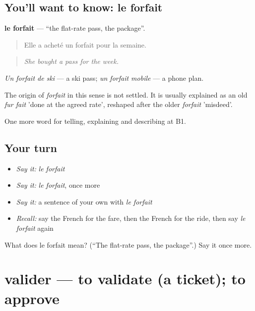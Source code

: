 \subsection*{You'll want to know: le forfait}
\textbf{le forfait} — \textquotedblleft{}the flat-rate pass, the package\textquotedblright{}.

\begin{quote}
Elle a acheté un forfait pour la semaine.
\end{quote}

\begin{quote}
\emph{She bought a pass for the week.}
\end{quote}

\emph{Un forfait de ski} — a ski pass; \emph{un forfait mobile} — a phone plan.

\begin{cousinweb}
The origin of \emph{forfait} in this sense is not settled. It is usually explained as an old \emph{fur fait} 'done at the agreed rate', reshaped after the older \emph{forfait} 'misdeed'.
\end{cousinweb}

\begin{grammarlens}[title={What you've built}]
One more word for telling, explaining and describing at B1.
\end{grammarlens}

\subsection*{Your turn}
\begin{itemize}
\raggedright
  \item \emph{Say it:} \emph{le forfait}
  \item \emph{Say it:} \emph{le forfait}, once more
  \item \emph{Say it:} a sentence of your own with \emph{le forfait}
  \item \emph{Recall:} say the French for the fare, then the French for the ride, then say \emph{le forfait} again
\end{itemize}

\begin{tcolorbox}[breakable,colback=teal!4,colframe=teal!35!black,title={Before you move on}]
What does le forfait mean? (\textquotedblleft{}The flat-rate pass, the package\textquotedblright{}.) Say it once more.
\end{tcolorbox}
\section[valider]{valider — to validate (a ticket); to approve}

